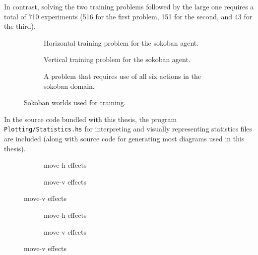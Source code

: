 \documentclass[Master.tex]{subfiles}
\providecommand{\master}{.}
\begin{document}
In contrast, solving the two training problems followed by the large one requires a total of 710 experiments (516 for the first problem, 151 for the second, and 43 for the third).

\begin{figure}
    \begin{subfigure}{0.3\textwidth}
        \resizebox{\linewidth}{!}{}
        \caption{Horizontal training problem for the sokoban agent.}\label{fig:results:train1}
    \end{subfigure}
    \begin{subfigure}{0.3\textwidth}
        \resizebox{\linewidth}{!}{}
        \caption{Vertical training problem for the sokoban agent.}\label{fig:results:train2}
    \end{subfigure}
    \begin{subfigure}{0.3\textwidth}
        \resizebox{\linewidth}{!}{}
        \caption{A problem that requires use of all six actions in the sokoban domain.}\label{fig:results:train3}
    \end{subfigure}
    \caption{Sokoban worlds used for training.}\label{fig:results:sokoTraining}
\end{figure}

In the source code bundled with this thesis, the program \texttt{Plotting/Statistics.hs} for interpreting and visually representing statistics files are included  (along with source code for generating most diagrams used in this thesis). 

\begin{figure}
    \centering
    \begin{subfigure}{0.45\linewidth}
        \resizebox{\linewidth}{!}{}
        \caption{move-h effects}\label{fig:res:ekmoveh}
    \end{subfigure}
    \begin{subfigure}{0.45\linewidth}
        \resizebox{\linewidth}{!}{}
        \caption{move-v effects}\label{fig:res:ekmovev}
    \end{subfigure}
\end{figure}

\begin{figure}
    \centering
    \begin{subfigure}{0.42\linewidth}
        \resizebox{\linewidth}{!}{}
        \caption{move-h effects}\label{fig:res:pkmoveh}
    \end{subfigure}
    \begin{subfigure}{0.42\linewidth}
        \resizebox{\linewidth}{!}{}
        \caption{move-v effects}\label{fig:res:pkmovev}
    \end{subfigure}
\end{figure}
\end{document}
